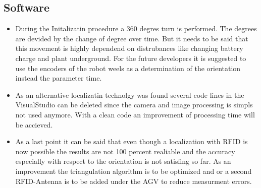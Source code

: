 \subsection{Software}
\begin{itemize}
\item During the Initalizatin procedure a 360 degres turn is performed. The degrees are devided by the change of degree over time. But it needs to be said that this movement is highly dependend on distrubances like changing battery charge and plant underground. For the future developers it is suggested to use the encoders of the robot weels as a determination of the orientation instead the parameter time.
\item As an alternative localizatin technolgy was found several code lines in the VisualStudio can be deleted since the camera and image processing is simpls not used anymore. With a clean code an improvement of processing time will be accieved.
\item As a last point it can be said that even though a localization with RFID is now possible the results are not 100 percent realiable and the accuracy especially with respect to the orientation is not satisfing so far. As an improvement the triangulation algorithm is to be optimized and or a second RFID-Antenna is to be added under the AGV to reduce measurment errors.
\end{itemize}